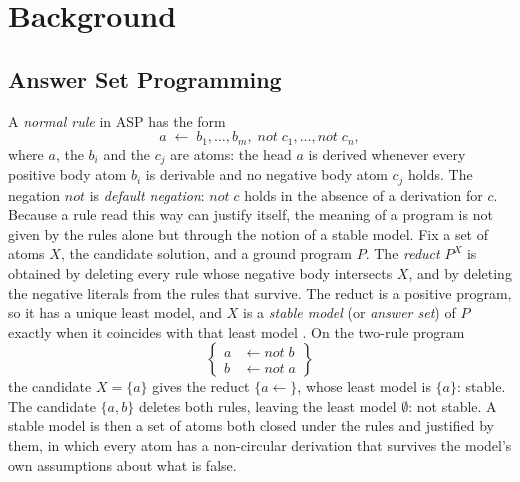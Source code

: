 \chapter{Background}
\label{sec:background}

\section{Answer Set Programming}
\label{sec:bg-asp}

A \emph{normal rule} in ASP has the form
\[
a \;\leftarrow\; b_1, \ldots, b_m,\; \mathit{not}\; c_1, \ldots, \mathit{not}\; c_n,
\]
where $a$, the $b_i$ and the $c_j$ are atoms: the head $a$ is derived whenever every positive body atom $b_i$ is derivable and no negative body atom $c_j$ holds. The negation $\mathit{not}$ is \emph{default negation}: $\mathit{not}\; c$ holds in the absence of a derivation for $c$.
Because a rule read this way can justify itself, the meaning of a program is not given by the rules alone but through the notion of a stable model. Fix a set of atoms $X$, the candidate solution, and a ground program $P$. The \emph{reduct} $P^X$ is obtained by deleting every rule whose negative body intersects $X$, and by deleting the negative literals from the rules that survive. The reduct is a positive program, so it has a unique least model, and $X$ is a \emph{stable model} (or \emph{answer set}) of $P$ exactly when it coincides with that least model \cite{gelfond1988stable}.
On the two-rule program
\[
\left\{
\begin{aligned}
a &\leftarrow \mathit{not}\; b\\
b &\leftarrow \mathit{not}\; a
\end{aligned}
\right\}
\]
the candidate $X = \{a\}$ gives the reduct $\{a \leftarrow\}$, whose least model is $\{a\}$: stable.
The candidate $\{a,b\}$ deletes both rules, leaving the least model $\emptyset$: not stable. 
A stable model is then a set of atoms both closed under the rules and justified by them, in which every atom has a non-circular derivation that survives the model's own assumptions about what is false.

